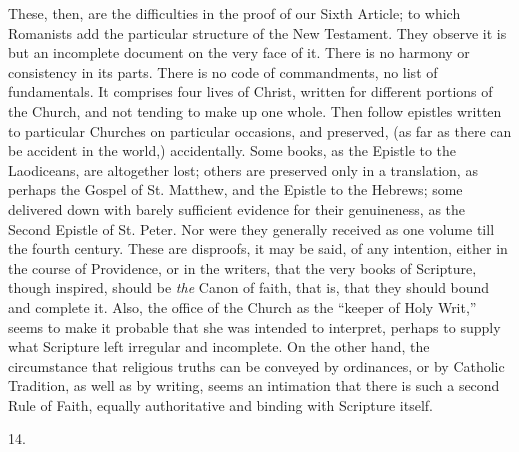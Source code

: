 These, then, are the difficulties in the proof of our Sixth
Article; to which Romanists add the particular structure of the New
Testament. They observe it is but an incomplete document on the very
face of it. There is no harmony or consistency in its parts. There is
no code of commandments, no list of fundamentals. It comprises four
lives of Christ, written for different portions of the Church, and not
tending to make up one whole. Then follow epistles written to
particular Churches on particular occasions, and preserved, (as
far as there can be accident in the world,) accidentally. Some books,
as the Epistle to the Laodiceans, are altogether lost; others are
preserved only in a translation, as perhaps the Gospel of St. Matthew,
and the Epistle to the Hebrews; some delivered down with barely
sufficient evidence for their genuineness, as the Second Epistle of
St. Peter. Nor were they generally received as one volume till the
fourth century. These are disproofs, it may be said, of any intention,
either in the course of Providence, or in the writers, that the very
books of Scripture, though inspired, should be \emph{the} Canon of
faith, that is, that they should bound and complete it. Also, the
office of the Church as the ``keeper of Holy Writ,'' seems to
make it probable that she was intended to interpret, perhaps to supply
what Scripture left irregular and incomplete. On the other hand, the
circumstance that religious truths can be conveyed by ordinances, or
by Catholic Tradition, as well as by writing, seems an intimation that
there is such a second Rule of Faith, equally authoritative and
binding with Scripture itself.

14.

